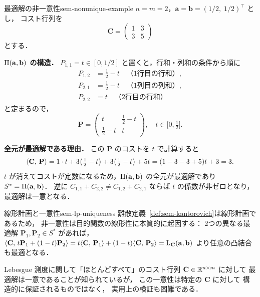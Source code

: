 \begin{example}{最適解の非一意性}{sem-nonunique-example}
  $n = m = 2$，$\mathbf{a} = \mathbf{b} = (1/2,\; 1/2)^\top$ とし，
  コスト行列を
  \[
    \mathbf{C} = \begin{pmatrix} 1 & 3 \\ 3 & 5 \end{pmatrix}
  \]
  とする．

  \textbf{$\Pi(\mathbf{a},\mathbf{b})$ の構造．}
  $P_{1,1} = t \in [0, 1/2]$ と置くと，行和・列和の条件から順に
  \begin{align*}
    P_{1,2} &= \tfrac{1}{2} - t \quad \text{（1行目の行和）},\\
    P_{2,1} &= \tfrac{1}{2} - t \quad \text{（1列目の列和）},\\
    P_{2,2} &= t              \quad \text{（2行目の行和）}
  \end{align*}
  と定まるので，
  \[
    \mathbf{P} = \begin{pmatrix} t & \tfrac{1}{2}-t \\ \tfrac{1}{2}-t & t \end{pmatrix}, \quad t \in \bigl[0,\tfrac{1}{2}\bigr].
  \]

  \textbf{全元が最適解である理由．}
  この $\mathbf{P}$ のコストを $t$ で計算すると
  \[
    \langle \mathbf{C},\, \mathbf{P} \rangle
    = 1 \cdot t + 3\!\left(\tfrac{1}{2}-t\right) + 3\!\left(\tfrac{1}{2}-t\right) + 5t
    = (1 - 3 - 3 + 5)t + 3 = 3.
  \]
  $t$ が消えてコストが定数になるため，$\Pi(\mathbf{a},\mathbf{b})$ の全元が最適解であり
  $S^* = \Pi(\mathbf{a},\mathbf{b})$．
  逆に $C_{1,1} + C_{2,2} \neq C_{1,2} + C_{2,1}$ ならば $t$ の係数が非ゼロとなり，最適解は一意となる．
\end{example}

\begin{remark}{線形計画と一意性}{sem-lp-uniqueness}
  離散定義~\ref{def:sem-kantorovich}は線形計画であるため，
  非一意性は目的関数の線形性に本質的に起因する：
  2つの異なる最適解 $\mathbf{P}_1, \mathbf{P}_2 \in S^*$ があれば，
  $\langle \mathbf{C},\, t\mathbf{P}_1 + (1-t)\mathbf{P}_2 \rangle
  = t\langle \mathbf{C},\, \mathbf{P}_1 \rangle + (1-t)\langle \mathbf{C},\, \mathbf{P}_2 \rangle
  = \mathrm{L}_{\mathbf{C}}(\mathbf{a},\mathbf{b})$
  より任意の凸結合も最適となる．

  Lebesgue 測度に関して「ほとんどすべて」のコスト行列
  $\mathbf{C} \in \mathbb{R}^{n \times m}$ に対して
  最適解は一意であることが知られているが，
  この一意性は特定の $\mathbf{C}$ に対して
  構造的に保証されるものではなく，
  実用上の検証も困難である．
\end{remark}

